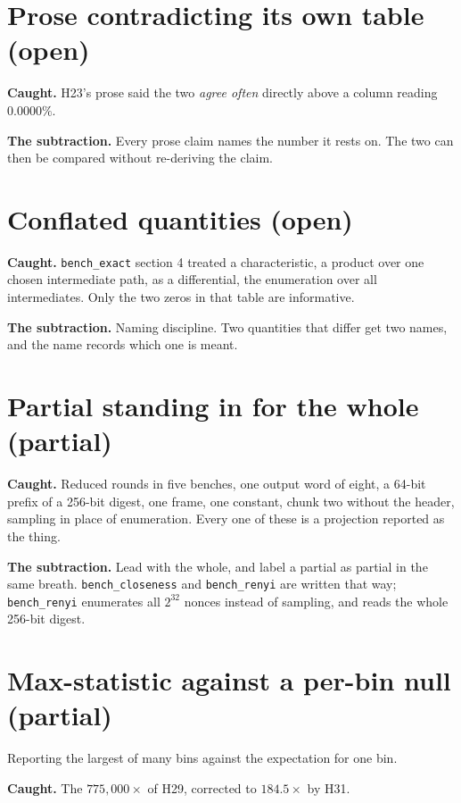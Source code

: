 \section{Prose contradicting its own table (open)}

\textbf{Caught.} H23's prose said the two \emph{agree often} directly above a column reading \(0.0000\%\).

\textbf{The subtraction.} Every prose claim names the number it rests on. The two can then be compared without re-deriving the claim.

\section{Conflated quantities (open)}

\textbf{Caught.} \texttt{bench\_exact} section 4 treated a characteristic, a product over one chosen intermediate path, as a differential, the enumeration over all intermediates. Only the two zeros in that table are informative.

\textbf{The subtraction.} Naming discipline. Two quantities that differ get two names, and the name records which one is meant.

\section{Partial standing in for the whole (partial)}

\textbf{Caught.} Reduced rounds in five benches, one output word of eight, a 64-bit prefix of a 256-bit digest, one frame, one constant, chunk two without the header, sampling in place of enumeration. Every one of these is a projection reported as the thing.

\textbf{The subtraction.} Lead with the whole, and label a partial as partial in the same breath. \texttt{bench\_closeness} and \texttt{bench\_renyi} are written that way; \texttt{bench\_renyi} enumerates all \(2^{32}\) nonces instead of sampling, and reads the whole 256-bit digest.

\section{Max-statistic against a per-bin null (partial)}

Reporting the largest of many bins against the expectation for one bin.

\textbf{Caught.} The \(775{,}000\times\) of H29, corrected to \(184.5\times\) by H31.

